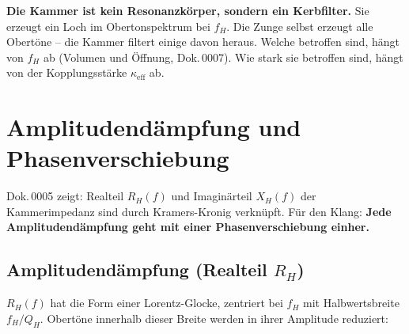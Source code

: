 \documentclass[11pt,a4paper]{article}
\begin{document}
\begin{keybox}
\textbf{Die Kammer ist kein Resonanzkörper, sondern ein Kerbfilter.} Sie erzeugt ein Loch im Obertonspektrum bei $f_H$. Die Zunge selbst erzeugt alle Obertöne -- die Kammer filtert einige davon heraus. Welche betroffen sind, hängt von $f_H$ ab (Volumen und Öffnung, Dok.\,0007). Wie stark sie betroffen sind, hängt von der Kopplungsstärke $\kappa_\text{eff}$ ab.
\end{keybox}


\section{Amplitudendämpfung und Phasenverschiebung}

Dok.\,0005 zeigt: Realteil $R_H(f)$ und Imaginärteil $X_H(f)$ der Kammerimpedanz sind durch Kramers-Kronig verknüpft. Für den Klang: \textbf{Jede Amplitudendämpfung geht mit einer Phasenverschiebung einher.}

\subsection{Amplitudendämpfung (Realteil $R_H$)}

$R_H(f)$ hat die Form einer Lorentz-Glocke, zentriert bei $f_H$ mit Halbwertsbreite $f_H/Q_H$. Obertöne innerhalb dieser Breite werden in ihrer Amplitude reduziert:

\begin{table}[H]
\centering\small
{}
\caption{Klangeffekt der Obertondämpfung nach Oberton-Ordnung}
\end{table}
\end{document}
